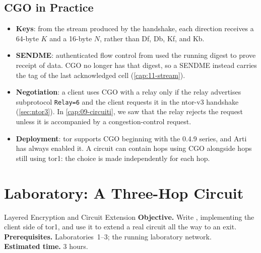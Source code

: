 \subsection{CGO in Practice}

\begin{itemize}
  \item \textbf{Keys}: from the stream produced by the handshake, each direction receives a 64-byte $K$ and a 16-byte $N$, rather than Df, Db, Kf, and Kb.
  \item \textbf{SENDME}: authenticated flow control from  used the running digest to prove receipt of data. CGO no longer has that digest, so a SENDME instead carries the tag of the last acknowledged cell (\cref{cap:11-stream}).
  \item \textbf{Negotiation}: a client uses CGO with a relay only if the relay advertises subprotocol \texttt{Relay=6} and the client requests it in the ntor-v3 handshake (\cref{sec:ntor3}). In \cref{cap:09-circuiti}, we saw that the relay rejects the request unless it is accompanied by a congestion-control request.
  \item \textbf{Deployment}: tor supports CGO beginning with the 0.4.9 series, and Arti has always enabled it. A circuit can contain hops using CGO alongside hops still using tor1: the choice is made independently for each hop.
\end{itemize}

\section{Laboratory: A Three-Hop Circuit}\label{sec:lab-cifratura}

\begin{laboratorio}[4]{Layered Encryption and Circuit Extension}
\textbf{Objective.} Write , implementing the client side of tor1, and use it to extend a real circuit all the way to an exit.\\
\textbf{Prerequisites.} Laboratories~1--3; the running laboratory network.\\
\textbf{Estimated time.} 3 hours.
\end{laboratorio}

